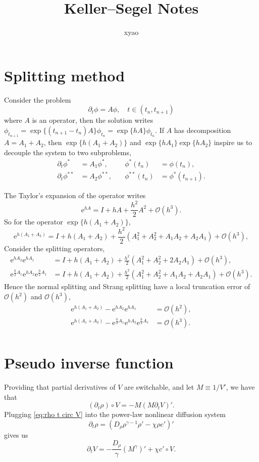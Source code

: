 \documentclass{article}
\title{Keller--Segel Notes}
\author{xyao}
\newcommand{\bigo}{\mathcal O}
\begin{document}
  \maketitle
  \section{Splitting method}
  Consider the problem
  \[
    \partial_t\phi = A\phi,\quad t\in(t_n, t_{n + 1})
  \]
  where $A$ is an operator, then the solution writes $\phi_{t_{n + 1}} = \exp\{(t_{n + 1} - t_n)A\}
  \phi_{t_n} = \exp\{hA\}\phi_{t_n}$.
  If $A$ has decomposition $A = A_1 + A_2$, then $\exp\{h(A_1 + A_2)\}$ and $\exp\{hA_1\}\exp\{hA_2\}$
  inspire us to decouple the system to two subproblems,
  \[
    \begin{aligned}
      \partial_t\phi^* &= A_1\phi^*,&\quad\phi^{*}(t_n) &= \phi(t_n), \\
      \partial_t\phi^{**} &= A_2\phi^{**},&\quad \phi^{**}(t_n) &= \phi^{*}(t_{n + 1}).
    \end{aligned}
  \]

  The Taylor's expansion of the operator writes
  \[
    \mathrm e^{hA} = I + hA + \frac{h^2}2 A^2 + \bigo(h^3).
  \]
  So for the operator $\exp\{h(A_1 + A_2)\}$,
  \[
    \mathrm e^{h(A_1 + A_2)} = I + h(A_1 + A_2) + \frac{h^2}2 (A_1^2 + A_2^2 + A_1A_2 + A_2A_1) + \bigo(h^3),
  \]
  Consider the splitting operators,
  \[
    \begin{aligned}
      \mathrm e^{hA_2}\mathrm e^{hA_1}
      &= I + h(A_1 + A_2) + \frac{h^2}2 (A_1^2 + A_2^2 + 2A_2A_1) + \bigo(h^3), \\
      \mathrm e^{\frac h2A_1}\mathrm e^{hA_2}\mathrm e^{\frac h2A_1}
      &= I + h(A_1 + A_2) + \frac{h^2}2 (A_1^2 + A_2^2 + A_1A_2+ A_2A_1) + \bigo(h^3).
    \end{aligned}
  \]
  Hence the normal splitting and Strang splitting have a local truncation error of $\bigo(h^2)$
  and $\bigo(h^3)$,
  \[
    \begin{aligned}
      \mathrm e^{h(A_1 + A_2)} - \mathrm e^{hA_2}\mathrm e^{hA_1} &= \bigo(h^2), \\
      \mathrm e^{h(A_1 + A_2)} - \mathrm e^{\frac h2A_1}\mathrm e^{hA_2}\mathrm e^{\frac h2A_1}
                                                                  &= \bigo(h^3). \\
    \end{aligned}
  \]

  \section{Pseudo inverse function}
  Providing that partial derivatives of $V$ are switchable, and let $M\equiv 1 / V'$, we have that
  \begin{equation}
    \label{eq:rho t circ V}
    (\partial_t\rho)\circ V = -M(M\partial_t V)'.
  \end{equation}
  Plugging \cref{eq:rho t circ V} into the power-law nonlinear diffusion system
  \[
    \partial_t \rho = \left(D_{\rho}\rho^{\gamma - 1}\rho' - \chi\rho c'\right)'
  \]
  gives us
  \[
    \partial_t V = -\frac{D_\rho}{\gamma}(M^\gamma)' + \chi c'\circ V.
  \]
\end{document}
